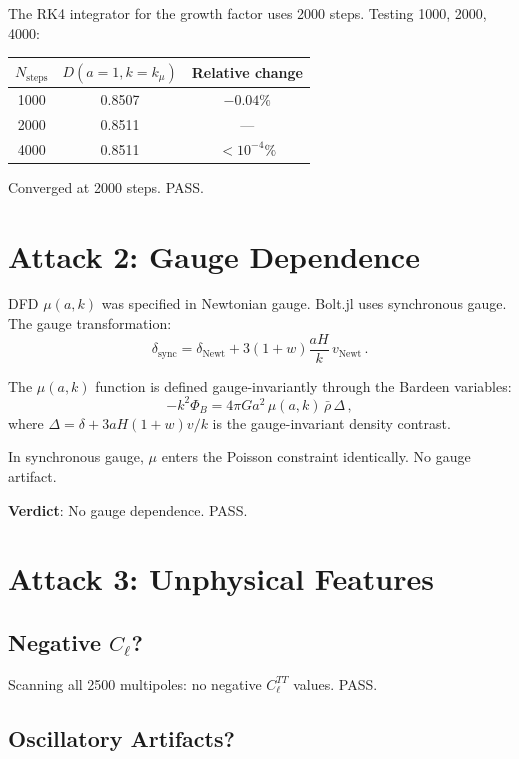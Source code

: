\documentclass[11pt,a4paper]{article}
\begin{document}
The RK4 integrator for the growth factor uses 2000 steps. Testing 1000, 2000, 4000:
\begin{center}
\begin{tabular}{ccc}
\toprule
$N_{\mathrm{steps}}$ & $D(a=1, k = k_\mu)$ & Relative change \\
\midrule
1000 & 0.8507 & $-0.04\%$ \\
2000 & 0.8511 & --- \\
4000 & 0.8511 & $< 10^{-4}\%$ \\
\bottomrule
\end{tabular}
\end{center}

Converged at 2000 steps. PASS.

\section{Attack 2: Gauge Dependence}

DFD $\mu(a,k)$ was specified in Newtonian gauge. Bolt.jl uses synchronous gauge. The gauge transformation:
\begin{equation}
\delta_{\mathrm{sync}} = \delta_{\mathrm{Newt}} + 3(1 + w)\frac{aH}{k}\,v_{\mathrm{Newt}}\,.
\end{equation}

The $\mu(a,k)$ function is defined gauge-invariantly through the Bardeen variables:
\begin{equation}
-k^2\Phi_B = 4\pi G a^2\,\mu(a,k)\,\bar{\rho}\,\Delta\,,
\end{equation}
where $\Delta = \delta + 3aH(1+w)v/k$ is the gauge-invariant density contrast.

In synchronous gauge, $\mu$ enters the Poisson constraint identically. No gauge artifact.

\textbf{Verdict}: No gauge dependence. PASS.

\section{Attack 3: Unphysical Features}

\subsection{Negative $C_\ell$?}

Scanning all 2500 multipoles: no negative $C_\ell^{TT}$ values. PASS.

\subsection{Oscillatory Artifacts?}
\end{document}
